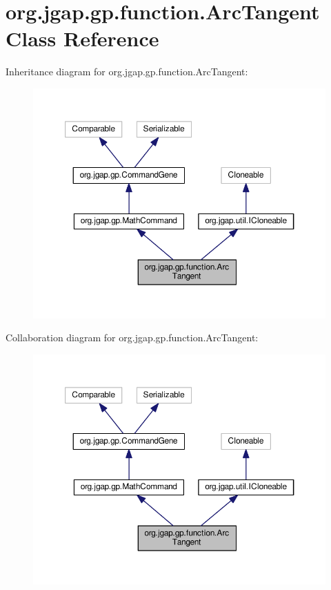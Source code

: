 \hypertarget{classorg_1_1jgap_1_1gp_1_1function_1_1_arc_tangent}{\section{org.\-jgap.\-gp.\-function.\-Arc\-Tangent Class Reference}
\label{classorg_1_1jgap_1_1gp_1_1function_1_1_arc_tangent}
}


Inheritance diagram for org.\-jgap.\-gp.\-function.\-Arc\-Tangent\-:
\nopagebreak
\begin{figure}[H]
\begin{center}
\leavevmode
\includegraphics[width=350pt]{classorg_1_1jgap_1_1gp_1_1function_1_1_arc_tangent__inherit__graph}
\end{center}
\end{figure}


Collaboration diagram for org.\-jgap.\-gp.\-function.\-Arc\-Tangent\-:
\nopagebreak
\begin{figure}[H]
\begin{center}
\leavevmode
\includegraphics[width=350pt]{classorg_1_1jgap_1_1gp_1_1function_1_1_arc_tangent__coll__graph}
\end{center}
\end{figure}
